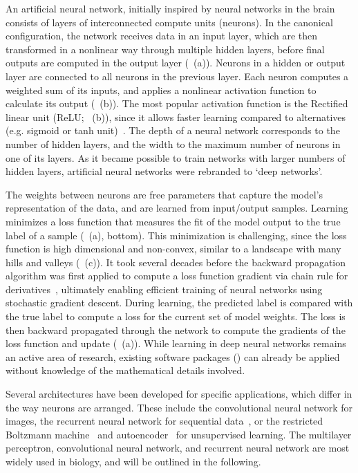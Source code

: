 An artificial neural network, initially inspired by neural networks in the brain~\citep{farley_simulation_1954,mcculloch_logical_1943,rosenblatt_perceptron:_1958} consists of layers of interconnected compute units (neurons). In the canonical configuration, the network receives data in an input layer, which are then transformed in a nonlinear way through multiple hidden layers, before final outputs are computed in the output layer (~(a)). Neurons in a hidden or output layer are connected to all neurons in the previous layer. Each neuron computes a weighted sum of its inputs, and applies a nonlinear activation function to calculate its output (~(b)). The most popular activation function is the Rectified linear unit (ReLU; ~(b)), since it allows faster learning compared to alternatives (e.g. sigmoid or tanh unit)~\citep{glorot_deep_2011}. The depth of a neural network corresponds to the number of hidden layers, and the width to the maximum number of neurons in one of its layers. As it became possible to train networks with larger numbers of hidden layers, artificial neural networks were rebranded to `deep networks'.

The weights between neurons are free parameters that capture the model's representation of the data, and are learned from input/output samples. Learning minimizes a loss function that measures the fit of the model output to the true label of a sample (~(a), bottom). This minimization is challenging, since the loss function is high dimensional and non-convex, similar to a landscape with many hills and valleys (~(c)). It took several decades before the backward propagation algorithm was first applied to compute a loss function gradient via chain rule for derivatives~\citep{rumelhart_learning_1988}, ultimately enabling efficient training of neural networks using stochastic gradient descent. During learning, the predicted label is compared with the true label to compute a loss for the current set of model weights. The loss is then backward propagated through the network to compute the gradients of the loss function and update (~(a)). While learning in deep neural networks remains an active area of research, existing software packages () can already be applied without knowledge of the mathematical details involved.

Several architectures have been developed for specific applications, which differ in the way neurons are arranged. These include the convolutional neural network for images, the recurrent neural network for sequential data~\citep{lipton_critical_2015,sutskever_training_2013}, or the restricted Boltzmann machine~\citep{hinton_practical_2012,salakhutdinov_efficient_2010} and autoencoder~\citep{alain_regularized_2012,hinton_reducing_2006,kingma_auto-encoding_2013} for unsupervised learning. The multilayer perceptron, convolutional neural network, and recurrent neural network are most widely used in biology, and will be outlined in the following.


